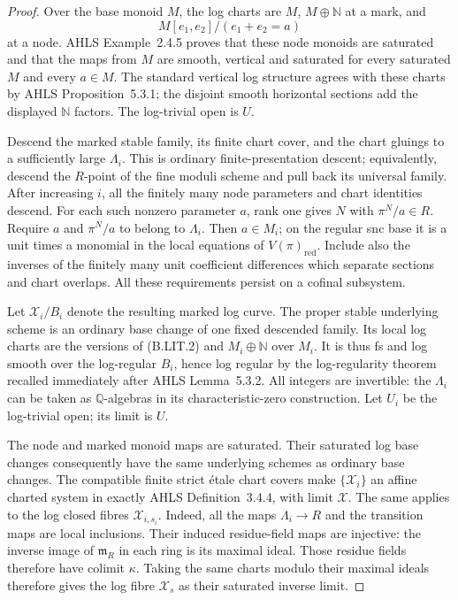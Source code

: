 \documentclass[11pt,a4paper]{article}
\providecommand{\mathscr}{\mathcal}
\begin{document}
\begin{proof}
Over the base monoid $M$, the log charts are $M$, $M\oplus\mathbb N$
at a mark, and
\[
       M[e_1,e_2]/(e_1+e_2=a)
                                                        \tag{B.LIT.2}
\]
at a node. AHLS Example~2.4.5 proves that these node monoids are
saturated and that the maps from $M$ are smooth, vertical and
saturated for every saturated $M$ and every $a\in M$.
The standard vertical log structure agrees with these charts by
AHLS Proposition~5.3.1; the disjoint smooth horizontal sections
add the displayed $\mathbb N$ factors. The log-trivial open is $U$.

Descend the marked stable family, its finite chart cover, and the
chart gluings to a sufficiently large $\Lambda_i$. This is ordinary
finite-presentation descent; equivalently, descend the $R$-point
of the fine moduli scheme and pull back its universal family.
After increasing $i$, all the finitely many node parameters and
chart identities descend. For each such nonzero parameter $a$,
rank one gives $N$ with $\pi^N/a\in R$. Require $a$ and
$\pi^N/a$ to belong to $\Lambda_i$. Then $a\in M_i$; on the
regular snc base it is a unit times a monomial in the local
equations of $V(\pi)_{\mathrm{red}}$. Include also the inverses
of the finitely many unit coefficient differences which separate
sections and chart overlaps. All these requirements persist on a
cofinal subsystem.

Let $\mathscr X_i/B_i$ denote the resulting marked log curve.
The proper stable underlying scheme is an ordinary base change
of one fixed descended family. Its local log charts are the
versions of (B.LIT.2) and $M_i\oplus\mathbb N$ over $M_i$.
It is thus fs and log smooth over the log-regular $B_i$, hence
log regular by the log-regularity theorem recalled immediately
after AHLS Lemma~5.3.2. All integers are invertible: the
$\Lambda_i$ can be taken as $\mathbb Q$-algebras in its
characteristic-zero construction. Let $U_i$ be the log-trivial
open; its limit is $U$.

The node and marked monoid maps are saturated. Their saturated
log base changes consequently have the same underlying schemes
as ordinary base changes. The compatible finite strict \'etale
chart covers make $\{\mathscr X_i\}$ an affine charted system
in exactly AHLS Definition~3.4.4, with limit $\mathscr X$.
The same applies to the log closed fibres
$\mathscr X_{i,s_i}$. Indeed, all the maps $\Lambda_i\to R$
and the transition maps are local inclusions. Their induced
residue-field maps are injective: the inverse image of
$\mathfrak m_R$ in each ring is its maximal ideal. Those
residue fields therefore have colimit $\kappa$. Taking the same charts modulo their maximal
ideals therefore gives the log fibre $\mathscr X_s$ as their
saturated inverse limit.


\end{proof}
\end{document}
